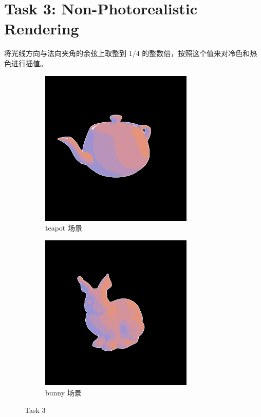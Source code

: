 \documentclass[UTF8]{ctexart}
\begin{document}
\section*{Task 3: Non-Photorealistic Rendering}

将光线方向与法向夹角的余弦上取整到 $1/4$ 的整数倍，按照这个值来对冷色和热色进行插值。

\begin{figure}[htbp]
    \begin{subfigure}[b]{0.49\textwidth}
        \centering
        \includegraphics[width=0.8\textwidth]{images/3-1.png}
        \caption{teapot 场景}
    \end{subfigure}
    \hfill
    \begin{subfigure}[b]{0.49\textwidth}
        \centering
        \includegraphics[width=0.8\textwidth]{images/3-2.png}
        \caption{bunny 场景}
    \end{subfigure}
    \caption*{Task 3}
\end{figure}
\end{document}
